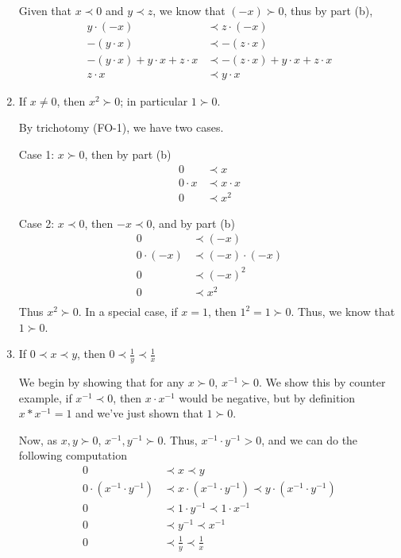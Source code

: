 \documentclass[11pt, leqno]{article}
\begin{document}
\begin{enumerate}[label=(\alph*)]
	Given that $x \prec 0$ and $y \prec z$, we know that $(-x) \succ 0$, thus by part (b),
	\begin{align*}
		y \cdot (-x) &\prec z \cdot (-x) \\
		- (y \cdot x)  &\prec - (z \cdot x) \\
		- (y \cdot x)  + y \cdot x + z \cdot x &\prec - (z \cdot x) + y \cdot x + z \cdot x \\
		z \cdot x &\prec y \cdot x
	\end{align*}
	
	\item If $x \neq 0$, then $x^2 \succ 0$; in particular $1 \succ 0$.
	
	By trichotomy (FO-1), we have two cases.
	
	Case 1: $x \succ 0$, then by part (b)
	 \begin{align*}
		0 &\prec x \\
		0 \cdot x &\prec x \cdot x \\
		0 &\prec x^2
	\end{align*}
	
	Case 2:  $x \prec 0$, then $ - x \prec 0$, and by part (b)
	\begin{align*}
		0 &\prec (-x) \\
		0 \cdot (-x) &\prec (-x) \cdot (-x) \\
		0 &\prec (-x)^2 \\
		0 &\prec x^2 \\
	\end{align*}
	Thus $x^2 \succ 0$. In a special case, if $x = 1$, then $1^2 = 1 \succ 0$. Thus, we know that $1 \succ 0$.
	
	\item 
	If $0 \prec x \prec y$, then $0 \prec \frac{1}{y} \prec \frac{1}{x}$
	
	We begin by showing that for any $x \succ 0$, $x^{-1} \succ 0$. We show this by counter example, if $x^{-1} \prec 0$, then $x \cdot x^{-1}$ would be negative, but by definition $x * x^{-1} = 1$ and we've just shown that $1 \succ 0$.
	
	Now, as $x, y \succ 0$, $x^{-1}, y^{-1} \succ 0$. Thus, $x^{-1} \cdot y^{-1} >0$, and we can do the following computation
	\begin{align*}
		0 &\prec x \prec y \\
		0 \cdot (x^{-1} \cdot y^{-1}) &\prec x \cdot (x^{-1} \cdot y^{-1}) \prec y \cdot (x^{-1} \cdot y^{-1}) \\
		0 &\prec 1 \cdot y^{-1} \prec 1 \cdot x^{-1} \\
		0 &\prec y^{-1} \prec  x^{-1} \\
		0 &\prec \frac{1}{y} \prec \frac{1}{x}
	\end{align*}
	
\end{enumerate}
\end{document}
